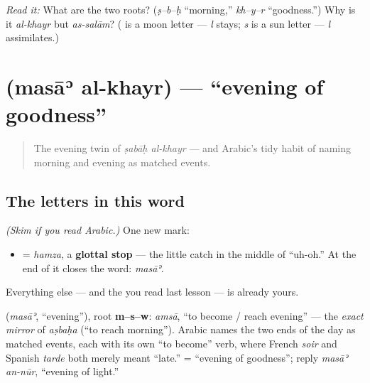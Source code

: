 \begin{tcolorbox}[breakable,colback=teal!4,colframe=teal!35!black,title={Before you move on}]
\emph{Read it:} \textbf{ } What are the two roots? (\emph{ṣ–b–ḥ} \textquotedblleft{}morning,\textquotedblright{} \emph{kh–y–r} \textquotedblleft{}goodness.\textquotedblright{}) Why is it \emph{al-khayr} but \emph{as-salām}? ( is a moon letter — \emph{l} stays; \emph{s} is a sun letter — \emph{l} assimilates.)
\end{tcolorbox}
\section[\texorpdfstring{\ar{مساء} \ar{الخير} (masāʾ al-khayr)}{مساء الخير (masāʾ al-khayr)}]{  (masāʾ al-khayr) — \textquotedblleft{}evening of goodness\textquotedblright{}}

\label{lesson:AR-C01-masa-al-khayr}



\begin{quote}
The evening twin of \emph{ṣabāḥ al-khayr} — and Arabic's tidy habit of naming morning and evening as matched events.
\end{quote}

\subsection*{The letters in this word}
\emph{(Skim if you read Arabic.)} One new mark:

\begin{itemize}
\raggedright
  \item \textbf{} = \emph{hamza}, a \textbf{glottal stop} — the little catch in the middle of \textquotedblleft{}uh-oh.\textquotedblright{} At the end of \textbf{} it closes the word: \emph{masāʾ}.
\end{itemize}

Everything else — \textbf{  } and the \textbf{} you read last lesson — is already yours.

\begin{cousinweb}
\textbf{} (\emph{masāʾ}, \textquotedblleft{}evening\textquotedblright{}), root \textbf{m–s–w}: \emph{amsā}, \textquotedblleft{}to become / reach evening\textquotedblright{} — the \emph{exact mirror} of \emph{aṣbaḥa} (\textquotedblleft{}to reach morning\textquotedblright{}). Arabic names the two ends of the day as matched events, each with its own \textquotedblleft{}to become\textquotedblright{} verb, where French \emph{soir} and Spanish \emph{tarde} both merely meant \textquotedblleft{}late.\textquotedblright{} \textbf{ } = \textquotedblleft{}evening of goodness\textquotedblright{}; reply \emph{masāʾ an-nūr}, \textquotedblleft{}evening of light.\textquotedblright{}
\end{cousinweb}

